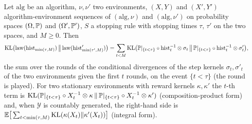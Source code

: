 \begin{lemma}\label{lem:stopped_history_chain_rule}
\leanok
{}
Let $\mathrm{alg}$ be an algorithm, $\nu,\nu'$ two environments, $(X,Y)$ and $(X',Y')$
algorithm-environment sequences of $(\mathrm{alg},\nu)$ and $(\mathrm{alg},\nu')$ on probability
spaces $(\Omega,\mathbb{P})$ and $(\Omega',\mathbb{P}')$, $S$ a stopping rule with stopping times $\tau$,
$\tau'$ on the two spaces, and $M \ge 0$. Then
\[
  \mathrm{KL}\big(\mathrm{law}(\mathrm{hist}_{\min(\tau,M)})\,\big\|\,\mathrm{law}(\mathrm{hist}'_{\min(\tau',M)})\big)
  = \sum_{t < M} \mathrm{KL}\big(\mathbb{P}|_{\{t<\tau\}}\circ\mathrm{hist}_t^{-1}\otimes\sigma_t\,\big\|\,
      \mathbb{P}|_{\{t<\tau\}}\circ\mathrm{hist}_t^{-1}\otimes\sigma'_t\big),
\]
the sum over the rounds of the conditional divergences of the step kernels $\sigma_t,\sigma'_t$
of the two environments given the first $t$ rounds, on the event $\{t < \tau\}$ (the round is
played). For two stationary environments with reward kernels $\kappa,\kappa'$ the $t$-th term is
$\mathrm{KL}(\mathbb{P}|_{\{t<\tau\}}\circ X_t^{-1}\otimes\kappa\,\|\,\mathbb{P}|_{\{t<\tau\}}\circ X_t^{-1}\otimes\kappa')$
(composition-product form) and, when $\mathcal{Y}$ is countably generated, the right-hand side is
$\mathbb{E}\big[\sum_{t<\min(\tau,M)}\mathrm{KL}(\kappa(X_t)\|\kappa'(X_t))\big]$ (integral form).
\end{lemma}

